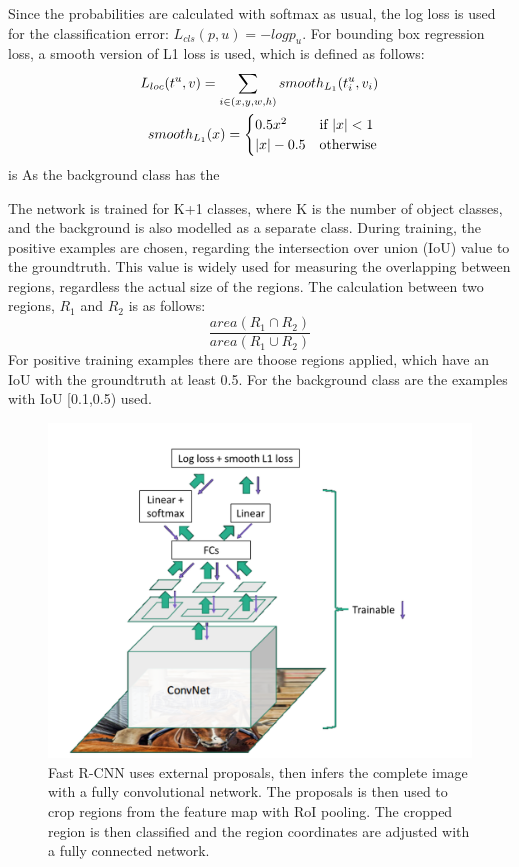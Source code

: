 Since the probabilities are calculated with softmax as usual, the log loss is used for the classification error: $L_{cls}(p,u) = -logp_u$. For bounding box regression loss, a smooth version of L1 loss is used, which is defined as follows:
\begin{align}\label{eq:c-smoothl1loss}
	L_{loc}(t^u, v) = \sum\limits_{i \in (x, y, w, h)} smooth_{L_{1}} (t_{i}^u, v_i)\\
	smooth_{L_{1}} (x) = \begin{cases}
               0.5 x^2 & \text{if } \lvert x\rvert < 1\\
               \lvert x\rvert-0.5 & \text{otherwise}
            \end{cases}
\end{align}
 is As the background class has the 

The network is trained for K+1 classes, where K is the number of object classes, and the background is also modelled as a separate class. During training, the positive examples are chosen, regarding the intersection over union (IoU) value to the groundtruth. This value is widely used for measuring the overlapping between regions, regardless the actual size of the regions. The calculation between two regions, $R_1$ and $R_2$ is as follows:
\begin{equation}\label{eq:c-iou}
        \frac{area ( R_1 \cap R_2 )}{area ( R_1 \cup R_2 )}
\end{equation}
For positive training examples there are thoose regions applied, which have an IoU with the groundtruth at least 0.5. For the background class are the examples with IoU [0.1,0.5) used.
\begin{figure}[h!]
	\centering
	\includegraphics[width=12cm]{images/mt/fast-rcnn.png}
	\caption{Fast R-CNN uses external proposals, then infers the complete image with a fully convolutional network. The proposals is then used to crop regions from the feature map with RoI pooling. The cropped region is then classified and the region coordinates are adjusted with a fully connected network.}
	\label{fig:rcnn}
\end{figure}

